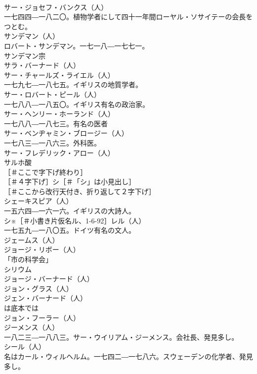 \documentclass[8pt]{extreport}
\begin{document}
\begin{CJK}{UTF8}{min}
\\	サー・ジョセフ・バンクス（人）
\\	一七四四―一八二〇。植物学者にして四十一年間ローヤル・ソサイテーの会長をつとむ。
\\	サンデマン（人）
\\	ロバート・サンデマン。一七一八―一七七一。
\\	サンデマン宗 
\\	サラ・バーナード（人）
\\	サー・チャールズ・ライエル（人）
\\	一七九七―一八七五。イギリスの地質学者。
\\	サー・ロバート・ピール（人）
\\	一七八八―一八五〇。イギリス有名の政治家。
\\	サー・ヘンリー・ホーランド（人）
\\	一七八八―一八七三。有名の医者
\\	サー・ベンヂャミン・ブロージー（人）
\\	一七八三―一八六三。外科医。
\\	サー・フレデリック・アロー（人）
\\	サルホ酸 
\\	［＃ここで字下げ終わり］
\\	［＃４字下げ］シ［＃「シ」は小見出し］
\\	［＃ここから改行天付き、折り返して２字下げ］
\\	シェーキスピア（人）
\\	一五六四―一六一六。イギリスの大詩人。
\\	シ※［＃小書き片仮名ル、1-6-92］レル（人）
\\	一七五九―一八〇五。ドイツ有名の文人。
\\	ジェームス（人）
\\	ジョージ・リボー（人）
\\	「市の科学会」 
\\	シリウム 
\\	ジョージ・バーナード（人）
\\	ジョン・グラス（人）
\\	ジェン・バーナード（人）
\\	は底本では
\\	ジョン・フーラー（人）
\\	ジーメンス（人）
\\	一八二三―一八八三。サー・ウイリアム・ジーメンス。会社長、発見多し。
\\	シール（人）
\\	名はカール・ウィルヘルム。一七四二―一七八六。スウェーデンの化学者、発見多し。

\end{CJK}
\end{document}
